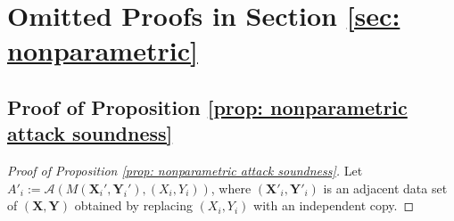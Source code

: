 \documentclass[letterpaper,12pt]{article}
\numberwithin{equation}{section}
\theoremstyle{plain}
\numberwithin{Theorem}{section}
\numberwithin{proposition}{section}
\numberwithin{Lemma}{section}
{
	\theoremstyle{definition}
	\newtheorem{Definition}{Definition}
	\newtheorem{example}{Example}
	\numberwithin{example}{section}
	\newtheorem{fact}{Fact}
	\numberwithin{fact}{section}
	\newtheorem{remark}{Remark}
}
\newcommand{\1}{\mathbbm{1}}
\begin{document}
\endgroup

\section{Omitted Proofs in Section \ref{sec: nonparametric}}\label{sec: nonparametric proofs}

\subsection{Proof of Proposition \ref{prop: nonparametric attack soundness}}\label{sec: proof of prop: nonparametric attack soundness}
\begin{proof}[Proof of Proposition \ref{prop: nonparametric attack soundness}]
	Let $A'_{i} := \mathcal A(M(\bm X_i', \bm Y_i'), (X_i, Y_i))$, where $(\bm X'_i, \bm Y'_i)$ is an adjacent data set of $(\bm X, \bm Y)$ obtained by replacing $(X_i, Y_i)$ with an independent copy.
	

\end{proof}
\end{document}
